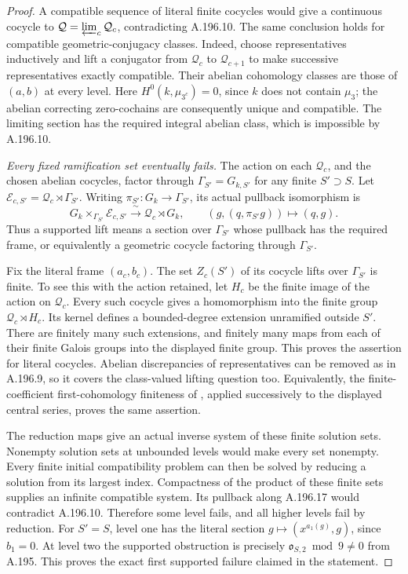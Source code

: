 \begin{proof}
A compatible sequence of literal finite cocycles would
give a continuous cocycle to \(\mathcal Q=\varprojlim_c
\mathcal Q_c\), contradicting A.196.10.  The same conclusion
holds for compatible geometric-conjugacy classes.  Indeed,
choose representatives inductively and lift a conjugator
from \(\mathcal Q_c\) to \(\mathcal Q_{c+1}\) to make
successive representatives exactly compatible.  Their
abelian cohomology classes are those of \((a,b)\) at every
level.  Here \(H^0(k,\mu_{3^c})=0\), since \(k\) does
not contain \(\mu_3\); the abelian correcting zero-cochains
are consequently unique and compatible.  The limiting
section has the required integral abelian class, which is
impossible by A.196.10.

\emph{Every fixed ramification set eventually fails.}
The action on each \(\mathcal Q_c\), and the chosen abelian
cocycles, factor through \(\Gamma_{S'}=G_{k,S'}\) for any
finite \(S'\supset S\).  Let
\(\mathcal E_{c,S'}=\mathcal Q_c\rtimes\Gamma_{S'}\).
Writing \(\pi_{S'}:G_k\to\Gamma_{S'}\), its actual
pullback isomorphism is
\[
 G_k\times_{\Gamma_{S'}}\mathcal E_{c,S'}
       \xrightarrow{\ \sim\ }\mathcal Q_c\rtimes G_k,
 \qquad (g,(q,\pi_{S'}g))\longmapsto(q,g).
\tag{A.196.17}
\]
Thus a supported lift means a section over \(\Gamma_{S'}\)
whose pullback has the required frame, or equivalently a
geometric cocycle factoring through \(\Gamma_{S'}\).

Fix the literal frame \((a_c,b_c)\).  The set \(Z_c(S')\)
of its cocycle lifts over \(\Gamma_{S'}\) is finite.  To see
this with the action retained, let \(H_c\) be the finite
image of the action on \(\mathcal Q_c\).  Every such cocycle
gives a homomorphism into the finite group
\(\mathcal Q_c\rtimes H_c\).  Its kernel defines a
bounded-degree extension unramified outside \(S'\).
There are finitely many such extensions, and finitely many
maps from each of their finite Galois groups into the
displayed finite group.  This proves the assertion for
literal cocycles.  Abelian discrepancies of representatives
can be removed as in A.196.9, so it covers the class-valued
lifting question too.  Equivalently, the finite-coefficient
first-cohomology finiteness of
\cite[I, Corollary 4.15]{BIR_MilneADT}, applied successively
to the displayed central series, proves the same assertion.

The reduction maps give an actual inverse system of these
finite solution sets.  Nonempty solution sets at unbounded
levels would make every set nonempty.  Every finite initial
compatibility problem can then be solved by reducing a
solution from its largest index.  Compactness of the product
of these finite sets supplies an infinite compatible system.
Its pullback along A.196.17 would contradict A.196.10.
Therefore some level fails, and all higher levels fail by
reduction.  For \(S'=S\), level one has the literal section
\(g\mapsto(x^{a_1(g)},g)\), since \(b_1=0\).
At level two the supported obstruction is precisely
\(\mathfrak o_{S,2}\bmod9\ne0\) from A.195.  This proves
the exact first supported failure claimed in the statement.


\end{proof}
